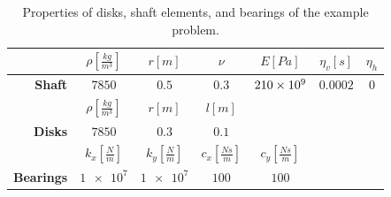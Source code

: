 \begin{table}
\caption{Properties of disks, shaft elements, and bearings of the example problem.} \label{tab:ExampleRotorTable}
\centering
\begin{tabular}{rcccccc}
						&$\rho[\frac{kg}{m^3}]$	&$r[m]$					&$\nu$				&$E[Pa]$			&$ \eta_v[s] $	&$ \eta_h $	\\\hline
	\textbf{Shaft}		&$7850$					&$0.5$					&$0.3$				&$\num{210E9}$		&$ 0.0002 $		&$ 0 $		\\[1em]
						&$\rho[\frac{kg}{m^3}]$	&$r[m]$					&$l[m]$				&					&				&			\\\hline
	\textbf{Disks}		&$7850$					&$0.3$					&$0.1$				&					&				&			\\[1em]
						&$k_x[\frac{N}{m}]$		&$k_y[\frac{N}{m}]$		&$c_x[\frac{Ns}{m}]$&$c_y[\frac{Ns}{m}]$&				&			\\\hline
	\textbf{Bearings}	&$\num{1e7}$			&$\num{1e7}$			&$100$				&$100$				&				&			
\end{tabular}
\centering
\end{table}
